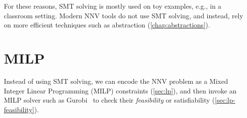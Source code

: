 \documentclass[oneside,11pt,dvipsnames]{book}
\numberwithin{equation}{section}
\theoremstyle{definition}
\theoremstyle{remark}
\newcommand{\tvn}[1]{\iftoggle{usecomment}{{\color{red}{[TVN]: #1}}}{}}
\newcommand{\hai}[1]{\iftoggle{usecomment}{{\color{blue}{[HD]: #1}}}{}}
\begin{document}
For these reasons, SMT solving is mostly used on toy examples, e.g., in a classroom setting.  Modern NNV tools do not use SMT solving, and instead, rely on more efficient techniques such as abstraction (\autoref{chap:abstractions}).


\section{MILP}\label{sec:using-milp}

Instead of using SMT solving, we can encode the NNV problem as a Mixed Integer Linear Programming (MILP) constraints (\autoref{sec:lp}), and then invoke an MILP solver such as Gurobi~\cite{gurobi} to check their \emph{feasibility} or satisfiability (\autoref{sec:lp-feasibility}).




\end{document}
